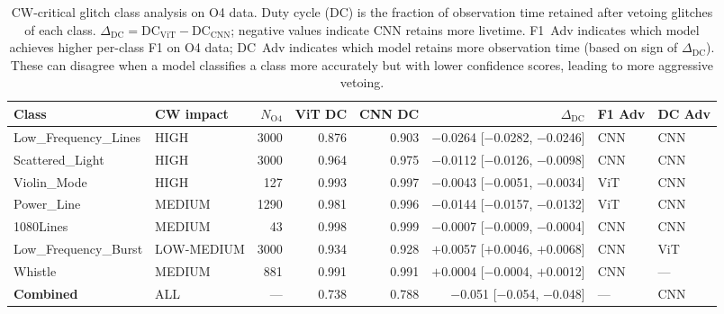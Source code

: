 \begin{table}
\centering
\caption{CW-critical glitch class analysis on O4 data. Duty cycle (DC) is the fraction of observation time retained after vetoing glitches of each class. $\Delta_\mathrm{DC} = \mathrm{DC}_\mathrm{ViT} - \mathrm{DC}_\mathrm{CNN}$; negative values indicate CNN retains more livetime. F1~Adv indicates which model achieves higher per-class F1 on O4 data; DC~Adv indicates which model retains more observation time (based on sign of $\Delta_\mathrm{DC}$). These can disagree when a model classifies a class more accurately but with lower confidence scores, leading to more aggressive vetoing.}
\label{tab:cw}
\begin{tabular}{llrrrrll}
\hline\hline
Class & CW impact & $N_\mathrm{O4}$ & ViT DC & CNN DC & $\Delta_\mathrm{DC}$ & F1 Adv & DC Adv \\
\hline
Low\_Frequency\_Lines & HIGH & 3000 & 0.876 & 0.903 & $-$0.0264 [$-$0.0282, $-$0.0246] & CNN & CNN \\
Scattered\_Light & HIGH & 3000 & 0.964 & 0.975 & $-$0.0112 [$-$0.0126, $-$0.0098] & CNN & CNN \\
Violin\_Mode & HIGH & 127 & 0.993 & 0.997 & $-$0.0043 [$-$0.0051, $-$0.0034] & ViT & CNN \\
Power\_Line & MEDIUM & 1290 & 0.981 & 0.996 & $-$0.0144 [$-$0.0157, $-$0.0132] & ViT & CNN \\
1080Lines & MEDIUM & 43 & 0.998 & 0.999 & $-$0.0007 [$-$0.0009, $-$0.0004] & CNN & CNN \\
Low\_Frequency\_Burst & LOW-MEDIUM & 3000 & 0.934 & 0.928 & $+$0.0057 [$+$0.0046, $+$0.0068] & CNN & ViT \\
Whistle & MEDIUM & 881 & 0.991 & 0.991 & $+$0.0004 [$-$0.0004, $+$0.0012] & CNN & --- \\
\hline
\textbf{Combined} & ALL & --- & 0.738 & 0.788 & $-$0.051 [$-$0.054, $-$0.048] & --- & CNN \\
\hline\hline
\end{tabular}
\end{table}